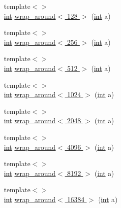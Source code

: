 \begin{DoxyCompactItemize}
\item 
{\footnotesize template$<$$>$ }\\\hyperlink{tk_8h_a83f82f76e7fed06f4c49d2db94028a6d}{int} \hyperlink{namespacedsp_a452ae016f495dcb13546371476b22718}{wrap\+\_\+around$<$ 128 $>$} (\hyperlink{tk_8h_a83f82f76e7fed06f4c49d2db94028a6d}{int} a)
\item 
{\footnotesize template$<$$>$ }\\\hyperlink{tk_8h_a83f82f76e7fed06f4c49d2db94028a6d}{int} \hyperlink{namespacedsp_ae908f5d317aeb85ea97833ef836fb88a}{wrap\+\_\+around$<$ 256 $>$} (\hyperlink{tk_8h_a83f82f76e7fed06f4c49d2db94028a6d}{int} a)
\item 
{\footnotesize template$<$$>$ }\\\hyperlink{tk_8h_a83f82f76e7fed06f4c49d2db94028a6d}{int} \hyperlink{namespacedsp_a01e5b607640a8f936db065f8094a5c63}{wrap\+\_\+around$<$ 512 $>$} (\hyperlink{tk_8h_a83f82f76e7fed06f4c49d2db94028a6d}{int} a)
\item 
{\footnotesize template$<$$>$ }\\\hyperlink{tk_8h_a83f82f76e7fed06f4c49d2db94028a6d}{int} \hyperlink{namespacedsp_aca4e9b59a346239f1688ba2b78debd0f}{wrap\+\_\+around$<$ 1024 $>$} (\hyperlink{tk_8h_a83f82f76e7fed06f4c49d2db94028a6d}{int} a)
\item 
{\footnotesize template$<$$>$ }\\\hyperlink{tk_8h_a83f82f76e7fed06f4c49d2db94028a6d}{int} \hyperlink{namespacedsp_a88398e8b3bff7aaca679e94de17b92e2}{wrap\+\_\+around$<$ 2048 $>$} (\hyperlink{tk_8h_a83f82f76e7fed06f4c49d2db94028a6d}{int} a)
\item 
{\footnotesize template$<$$>$ }\\\hyperlink{tk_8h_a83f82f76e7fed06f4c49d2db94028a6d}{int} \hyperlink{namespacedsp_af6fc92d8ac8826c696bbb995b45b06f9}{wrap\+\_\+around$<$ 4096 $>$} (\hyperlink{tk_8h_a83f82f76e7fed06f4c49d2db94028a6d}{int} a)
\item 
{\footnotesize template$<$$>$ }\\\hyperlink{tk_8h_a83f82f76e7fed06f4c49d2db94028a6d}{int} \hyperlink{namespacedsp_a51e76125c3844192cb144d8ba47f8b84}{wrap\+\_\+around$<$ 8192 $>$} (\hyperlink{tk_8h_a83f82f76e7fed06f4c49d2db94028a6d}{int} a)
\item 
{\footnotesize template$<$$>$ }\\\hyperlink{tk_8h_a83f82f76e7fed06f4c49d2db94028a6d}{int} \hyperlink{namespacedsp_a281059a04915345736238e9e4b40be99}{wrap\+\_\+around$<$ 16384 $>$} (\hyperlink{tk_8h_a83f82f76e7fed06f4c49d2db94028a6d}{int} a)

\end{DoxyCompactItemize}
